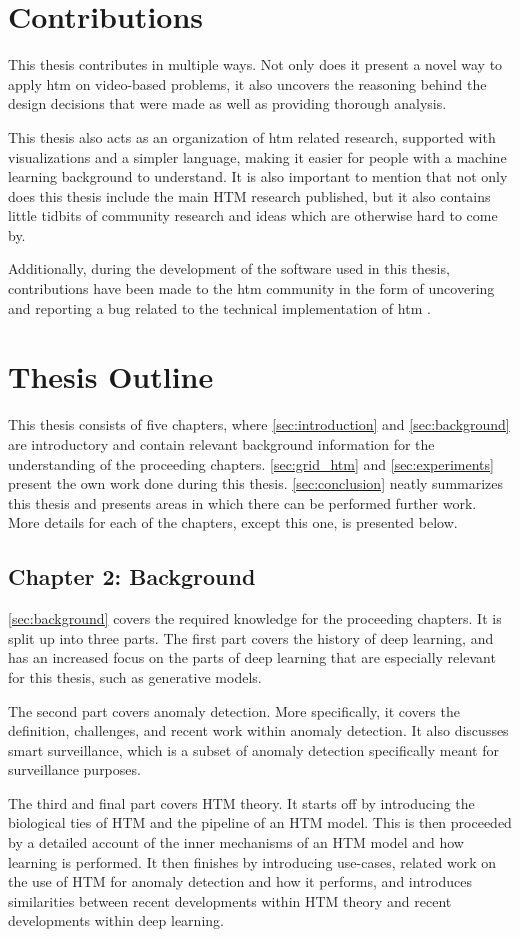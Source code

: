 \section{Contributions}
This thesis contributes in multiple ways. Not only does it present a novel way to apply  \gls*{htm} on video-based problems, it also uncovers the reasoning behind the design decisions that were made as well as providing thorough analysis.
\par
This thesis also acts as an organization of  \gls*{htm} related research, supported with visualizations and a simpler language, making it easier for people with a machine learning background to understand. It is also important to mention that not only does this thesis include the main HTM research published, but it also contains little tidbits of community research and ideas which are otherwise hard to come by.
\par
Additionally, during the development of the software used in this thesis, contributions have been made to the  \gls*{htm} community in the form of uncovering and reporting a bug related to the technical implementation of  \gls*{htm} \cite{github_contrib}.
\section{Thesis Outline}
This thesis consists of five chapters, where \autoref{sec:introduction} and \autoref{sec:background} are introductory and contain relevant background information for the understanding of the proceeding chapters. \autoref{sec:grid_htm} and \autoref{sec:experiments} present the own work done during this thesis. \autoref{sec:conclusion} neatly summarizes this thesis and presents areas in which there can be performed further work. More details for each of the chapters, except this one, is presented below.
\par
\subsection*{Chapter 2: Background}
\autoref{sec:background} covers the required knowledge for the proceeding chapters. It is split up into three parts. The first part covers the history of deep learning, and has an increased focus on the parts of deep learning that are especially relevant for this thesis, such as generative models.
\par
The second part covers anomaly detection. More specifically, it covers the definition, challenges, and recent work within anomaly detection. It also discusses smart surveillance, which is a subset of anomaly detection specifically meant for surveillance purposes.
\par
The third and final part covers HTM theory. It starts off by introducing the biological ties of HTM and the pipeline of an HTM model. This is then proceeded by a detailed account of the inner mechanisms of an HTM model and how learning is performed. It then finishes by introducing use-cases, related work on the use of HTM for anomaly detection and how it performs, and introduces similarities between recent developments within HTM theory and recent developments within deep learning.
